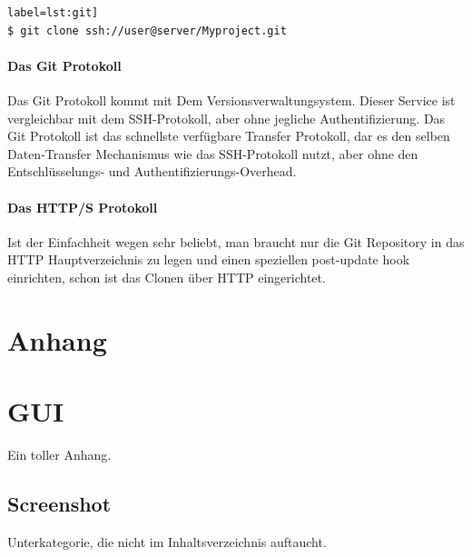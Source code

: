 \documentclass[12pt,a4paper,bibliography=totocnumbered,listof=totocnumbered]{scrartcl}
\begin{document}
\begin{lstlisting}[caption=Mit Präfix] label=lst:git]
$ git clone ssh://user@server/Myproject.git
\end{lstlisting}

\paragraph{Das Git Protokoll}
Das Git Protokoll kommt mit Dem Versionsverwaltungsystem.
Dieser Service ist vergleichbar mit dem SSH-Protokoll, aber ohne jegliche Authentifizierung. Das Git Protokoll ist das schnellste verfügbare Transfer Protokoll, dar es den selben Daten-Transfer Mechanismus wie das SSH-Protokoll nutzt, aber ohne den Entschlüsselungs- und Authentifizierungs-Overhead.

\paragraph{Das HTTP/S Protokoll}
Ist der Einfachheit wegen sehr beliebt, man braucht nur die Git Repository in das HTTP Hauptverzeichnis zu legen und einen speziellen post-update hook einrichten, schon ist das Clonen über HTTP eingerichtet.  

\newpage

\renewcommand\refname{Quellenverzeichnis}


\pagebreak

\setcounter{page}{1}

\begin{appendix}
\section*{Anhang}
{}

\section{GUI}
Ein toller Anhang.

\subsection*{Screenshot}
\label{app:screenshot}
Unterkategorie, die nicht im Inhaltsverzeichnis auftaucht.

\end{appendix}
\end{document}
